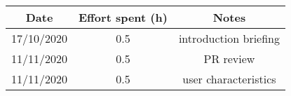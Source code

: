\documentclass[../../main.tex]{subfiles}
\begin{document}
\begin{center}
    \begin{tabular}{|c| |c| |c|} 
        \hline
        Date & Effort spent (h) & Notes\\ [0.5ex] 
        \hline\hline
        17/10/2020 & 0.5 & introduction briefing\\ 
        \hline
        11/11/2020 & 0.5 & PR review\\
        \hline
        11/11/2020 & 0.5 & user characteristics\\
        \hline

    \end{tabular}
\end{center}
\end{document}
